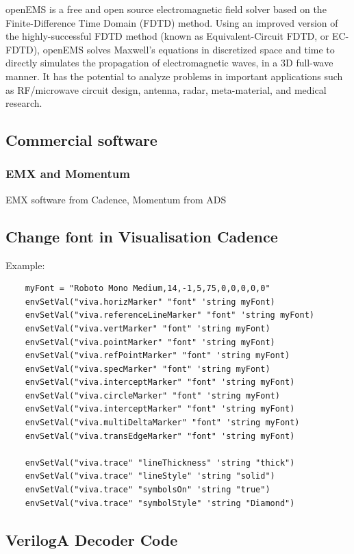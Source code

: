 \documentclass{article}
\begin{document}
openEMS is a free and open source electromagnetic field solver based on the Finite-Difference Time Domain (FDTD) method. Using an improved version of the highly-successful FDTD method (known as Equivalent-Circuit FDTD, or EC-FDTD), openEMS solves Maxwell's equations in discretized space and time to directly simulates the propagation of electromagnetic waves, in a 3D full-wave manner. It has the potential to analyze problems in important applications such as RF/microwave circuit design, antenna, radar, meta-material, and medical research.

\subsection{Commercial software}

\subsubsection{EMX and Momentum}
EMX software from Cadence, Momentum from ADS

\newpage

\subsection{Change font in Visualisation Cadence}

Example:

\begin{verbatim}
	myFont = "Roboto Mono Medium,14,-1,5,75,0,0,0,0,0"
	envSetVal("viva.horizMarker" "font" 'string myFont)
	envSetVal("viva.referenceLineMarker" "font" 'string myFont)
	envSetVal("viva.vertMarker" "font" 'string myFont)
	envSetVal("viva.pointMarker" "font" 'string myFont)
	envSetVal("viva.refPointMarker" "font" 'string myFont)
	envSetVal("viva.specMarker" "font" 'string myFont)
	envSetVal("viva.interceptMarker" "font" 'string myFont)
	envSetVal("viva.circleMarker" "font" 'string myFont)
	envSetVal("viva.interceptMarker" "font" 'string myFont)
	envSetVal("viva.multiDeltaMarker" "font" 'string myFont)
	envSetVal("viva.transEdgeMarker" "font" 'string myFont)

	envSetVal("viva.trace" "lineThickness" 'string "thick")
	envSetVal("viva.trace" "lineStyle" 'string "solid")
	envSetVal("viva.trace" "symbolsOn" 'string "true")
	envSetVal("viva.trace" "symbolStyle" 'string "Diamond")
\end{verbatim}



\subsection{VerilogA Decoder Code}
\end{document}
